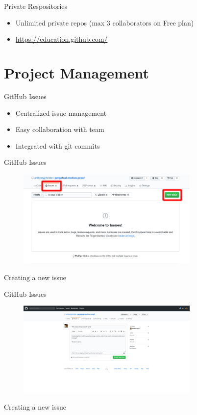 \documentclass{beamer}
\begin{document}
    \begin{frame}{Private Respositories}
        \begin{itemize}
            \item Unlimited private repos (max 3 collaborators on Free plan)
            \item \url{https://education.github.com/}
        \end{itemize}
    \end{frame}

    \section{Project Management}\label{sec:project-management}
    \begin{frame}{GitHub Issues}
        \begin{itemize}
            \item Centralized issue management
            \item Easy collaboration with team
            \item Integrated with git commits
        \end{itemize}
    \end{frame}

    \begin{frame}{GitHub Issues}
        \begin{figure}
            \centering
            \includegraphics[width=0.8\textwidth]{figures/issues_1.png}
        \end{figure}
        \centering
        Creating a new issue
    \end{frame}

    \begin{frame}{GitHub Issues}
        \begin{figure}
            \centering
            \includegraphics[width=0.8\textwidth]{figures/issues_2.png}
        \end{figure}
        \centering
        Creating a new issue
    \end{frame}
\end{document}
